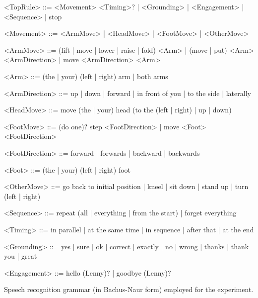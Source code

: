 \setlength{\grammarindent}{9em} 

\begin{table}[p]
\begin{grammar}

<TopRule> ::= <Movement> <Timing>? | <Grounding> | <Engagement> | <Sequence> | stop

<Movement> ::= <ArmMove> | <HeadMove> | <FootMove> |  <OtherMove>

<ArmMove> ::= (lift | move | lower | raise | fold) <Arm> | (move | put) <Arm> <ArmDirection> | move <ArmDirection> <Arm>

<Arm> ::= (the | your) (left | right) arm | both arms

<ArmDirection> ::= up | down | forward | in front of you | to the side | laterally

<HeadMove> ::= move (the | your) head (to the (left | right) | up | down)

<FootMove> ::= (do one)? step <FootDirection> | move <Foot> <FootDirection>

<FootDirection> ::= forward | forwards | backward | backwards

<Foot> ::= (the | your) (left | right) foot

<OtherMove> ::= go back to initial position | kneel | sit down | stand up | turn (left | right)  

<Sequence> ::= repeat (all | everything | from the start) | forget everything

<Timing> ::= in parallel | at the same time | in sequence | after that | at the end

<Grounding> ::= yes | sure | ok | correct | exactly | no | wrong  | thanks | thank you | great

<Engagement> ::= hello (Lenny)? | goodbye (Lenny)? 

\end{grammar}
\caption{Speech recognition grammar (in Bachus-Naur form) employed for the experiment.}
\label{table:asr_woz}
\end{table}


